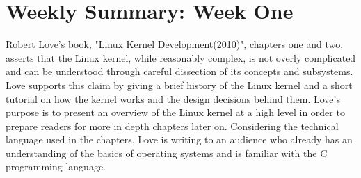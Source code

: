 \documentclass[letterpaper,10pt]{article}
\begin{document}
\section{Weekly Summary: Week One}
Robert Love's book, "Linux Kernel Development(2010)", chapters one and two, asserts that the Linux kernel, while reasonably complex, is not overly complicated and can be understood through careful dissection of its concepts and subsystems. Love supports this claim by giving a brief history of the Linux kernel and a short tutorial on how the kernel works and the design decisions behind them. Love's purpose is to present an overview of the Linux kernel at a high level in order to prepare readers for more in depth chapters later on. Considering the technical language used in the chapters, Love is writing to an audience who already has an understanding of the basics of operating systems and is familiar with the C programming language.
\end{document}
